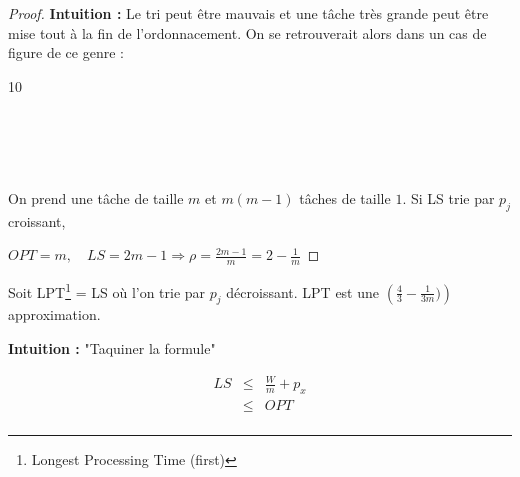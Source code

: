 \documentclass[a4paper, 11pt]{thesis}
\newcommand{\openord}[1]{\begin{center}\begin{ganttchart}[hgrid=true,vgrid={{dotted}},inline]{#1}
    \gantttitlelist{1,...,#1}{1}\\}
\newcommand{\closeord}{\end{ganttchart}\end{center}}
\begin{document}
\begin{proof}
\textbf{Intuition :} Le tri peut être mauvais et une tâche très grande peut être mise tout à la fin
de l'ordonnacement. On se retrouverait alors dans un cas de figure de ce genre :

\openord{10}
     \\
     \\
     \\
     \\
\closeord

On prend une tâche de taille $m$ et $m(m - 1)$ tâches de taille $1$. Si LS trie par $p_j$ croissant,

\begin{center}
\end{center}

$OPT = m,\quad LS = 2 m - 1 \Rightarrow \rho = \frac{2m -1}{m} = 2 - \frac{1}{m}$
\end{proof}

\begin{thrm}
    Soit LPT\footnote{Longest Processing Time (first)} = LS où l'on trie par $p_j$ décroissant.
    LPT est une $\left (\frac{4}{3} - \frac{1}{3m})\right )$ approximation.
\end{thrm}

\textbf{Intuition :} "Taquiner la formule"

\begin{displaymath}\begin{array}{rcl}
LS & \leq & \displaystyle \frac{W}{m} + p_x \\
   & \leq & OPT \\
\end{array}
\end{displaymath}
\end{document}
